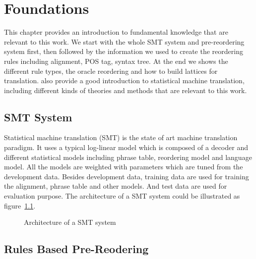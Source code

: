 
\chapter{Foundations}
\label{ch:Foundations}

This chapter provides an introduction to fundamental knowledge that are relevant to this work. We start with the whole SMT system and pre-reordering system first, then followed by the information we used to create the reordering rules including alignment, POS tag, syntax tree. At the end we shows the different rule types, the oracle reordering and how to build lattices for translation. \cite{book} also provide a good introduction to statistical machine translation, including different kinds of theories and methods that are relevant to this work.

\section{SMT System}
\label{ch:Foundations:sec:SMTSystem}


Statistical machine translation (SMT) is the state of art machine translation paradigm. It uses a typical log-linear model which is composed of a decoder and different statistical models including phrase table, reordering model and language model. All the models are weighted with parameters which are tuned from the development data. Besides development data, training data are used for training the alignment, phrase table and other models. And test data are used for evaluation purpose. The architecture of a SMT system could be illustrated as figure~\ref{smt}.

\begin{figure}
\centering

\caption{Architecture of a SMT system}
\label{smt}
\end{figure}

\section{Rules Based Pre-Reodering}
\label{ch:Foundations:sec:PreReorderingSystem}

